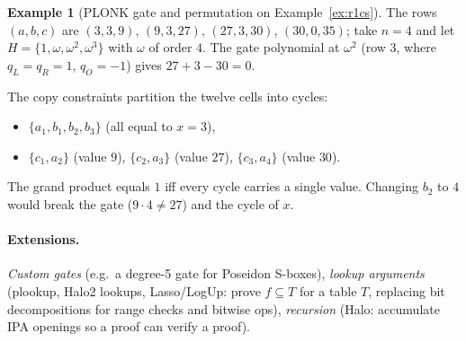 \documentclass[11pt,a4paper]{report}
\theoremstyle{plain}
\theoremstyle{definition}
\newtheorem{example}[theorem]{Example}
\theoremstyle{remark}
\begin{document}
\begin{example}[PLONK gate and permutation on Example~\ref{ex:r1cs}]
The rows $(a,b,c)$ are $(3,3,9)$, $(9,3,27)$, $(27,3,30)$, $(30,0,35)$; take $n=4$ and let $H=\{1,\omega,\omega^2,\omega^3\}$ with $\omega$ of order $4$. The gate polynomial at $\omega^2$ (row 3, where $q_L=q_R=1$, $q_O=-1$) gives $27+3-30=0$. \checkmark

The copy constraints partition the twelve cells into cycles:
\begin{itemize}[nosep]
\item $\{a_1,b_1,b_2,b_3\}$ (all equal to $x=3$),
\item $\{c_1,a_2\}$ (value $9$), $\{c_2,a_3\}$ (value $27$), $\{c_3,a_4\}$ (value $30$).
\end{itemize}
The grand product equals $1$ iff every cycle carries a single value. Changing $b_2$ to $4$ would break the gate ($9\cdot4\ne27$) and the cycle of $x$.
\end{example}
\paragraph{Extensions.} \emph{Custom gates} (e.g.\ a degree-5 gate for Poseidon S-boxes), \emph{lookup arguments} (plookup, Halo2 lookups, Lasso/LogUp: prove $f\subseteq T$ for a table $T$, replacing bit decompositions for range checks and bitwise ops), \emph{recursion} (Halo: accumulate IPA openings so a proof can verify a proof).
\end{document}
